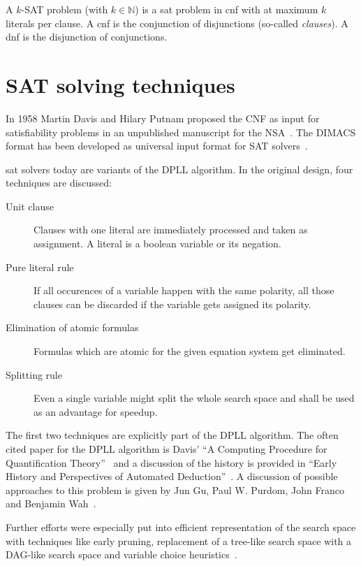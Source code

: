 A $k$-SAT problem (with $k \in \mathbb{N}$) is a \gls{sat} problem in \gls{cnf} with at maximum $k$ literals per clause. A \gls{cnf} is the conjunction of disjunctions (so-called \emph{clauses}). A \gls{dnf} is the disjunction of conjunctions.

\section{SAT solving techniques}
\label{sec:satsolvers}
%
In 1958 Martin Davis and Hilary Putnam proposed the CNF as input for satisfiability problems in an unpublished manuscript for the NSA~\cite{Sat20}. The DIMACS format has been developed as universal input format for SAT solvers~\cite{Sat09}.

\gls{sat} solvers today are variants of the DPLL algorithm. In the original design, four techniques are discussed:
\begin{description}
  \item[Unit clause] Clauses with one literal are immediately processed and taken as assignment. A literal is a boolean variable or its negation.
  \item[Pure literal rule] If all occurences of a variable happen with the same polarity, all those clauses can be discarded if the variable gets assigned its polarity.
  \item[Elimination of atomic formulas] Formulas which are atomic for the given equation system get eliminated.
  \item[Splitting rule] Even a single variable might split the whole search space and shall be used as an advantage for speedup.
\end{description}
%
The first two techniques are explicitly part of the DPLL algorithm. The often cited paper for the DPLL algorithm is Davis' ``A Computing Procedure for Quantification Theory''~\cite{Sat05} and a discussion of the history is provided in ``Early History and Perspectives of Automated Deduction''~\cite{Sat06}. A discussion of possible approaches to this problem is given by Jun Gu, Paul W. Purdom, John Franco and Benjamin Wah~\cite{Sat08}.

Further efforts were especially put into efficient representation of the search space with techniques like early pruning, replacement of a tree-like search space with a DAG-like search space and variable choice heuristics~\cite[24]{Sat20}.


